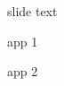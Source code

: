 \documentclass{slides}
\begin{document}
slide text
\begin{slide}
app 1
\end{slide}

\begin{slide}
app 2
\end{slide}
\end{document}
